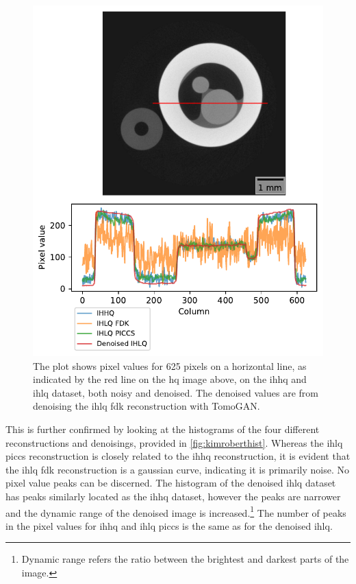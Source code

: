 \begin{figure}[htbp]
  \centering
  \includegraphics[width=.95\textwidth]{figures/kimrobertline.pdf}
  \caption[Pixel value plot of IHHQ and IHLQ, noisy and denoised]{The plot shows pixel values for 625 pixels on a horizontal line, as indicated by the red line on the \gls{hq} image above, on the \gls{ihhq} and \gls{ihlq} dataset, both noisy and denoised. The denoised values are from denoising the \gls{ihlq} \gls{fdk} reconstruction with TomoGAN. }
  \label{fig:kimrobertline}
\end{figure}

This is further confirmed by looking at the histograms of the four different reconstructions and denoisings, provided in \cref{fig:kimroberthist}. Whereas the \gls{ihlq} \gls{piccs} reconstruction is closely related to the \gls{ihhq} reconstruction, it is evident that the \gls{ihlq} \gls{fdk} reconstruction is a gaussian curve, indicating it is primarily noise. No pixel value peaks can be discerned. The histogram of the denoised \gls{ihlq} dataset has peaks similarly located as the \gls{ihhq} dataset, however the peaks are narrower and the dynamic range of the denoised image is increased.\footnote{Dynamic range refers the ratio between the brightest and darkest parts of the image. } The number of peaks in the pixel values for \gls{ihhq} and \gls{ihlq} \gls{piccs} is the same as for the denoised \gls{ihlq}. 

